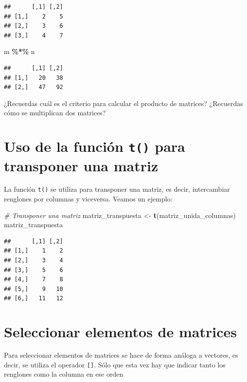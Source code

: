 \documentclass[
]{book}
\newenvironment{Shaded}{\begin{snugshade}}{\end{snugshade}}
\newcommand{\CommentTok}[1]{\textcolor[rgb]{0.56,0.35,0.01}{\textit{#1}}}
\newcommand{\FunctionTok}[1]{\textcolor[rgb]{0.13,0.29,0.53}{\textbf{#1}}}
\newcommand{\NormalTok}[1]{#1}
\newcommand{\OtherTok}[1]{\textcolor[rgb]{0.56,0.35,0.01}{#1}}
\newcommand{\SpecialCharTok}[1]{\textcolor[rgb]{0.81,0.36,0.00}{\textbf{#1}}}
\begin{document}
\begin{verbatim}
##      [,1] [,2]
## [1,]    2    5
## [2,]    3    6
## [3,]    4    7
\end{verbatim}

\begin{Shaded}
\begin{Highlighting}[]
\NormalTok{m }\SpecialCharTok{\%*\%}\NormalTok{ n }
\end{Highlighting}
\end{Shaded}

\begin{verbatim}
##      [,1] [,2]
## [1,]   20   38
## [2,]   47   92
\end{verbatim}

¿Recuerdas cuál es el criterio para calcular el producto de matrices?
¿Recuerdas cómo se multiplican dos matrices?

\section{\texorpdfstring{Uso de la función \texttt{t()} para transponer una matriz}{Uso de la función t() para transponer una matriz}}\label{uso-de-la-funciuxf3n-t-para-transponer-una-matriz}

La función \texttt{t()} se utiliza para transponer una matriz, es decir, intercambiar renglones por columnas y viceversa. Veamos un ejemplo:

\begin{Shaded}
\begin{Highlighting}[]
\CommentTok{\# Transponer una matriz}
\NormalTok{matriz\_transpuesta }\OtherTok{\textless{}{-}} \FunctionTok{t}\NormalTok{(matriz\_unida\_columnas)}
\NormalTok{matriz\_transpuesta}
\end{Highlighting}
\end{Shaded}

\begin{verbatim}
##      [,1] [,2]
## [1,]    1    2
## [2,]    3    4
## [3,]    5    6
## [4,]    7    8
## [5,]    9   10
## [6,]   11   12
\end{verbatim}

\section{Seleccionar elementos de matrices}\label{seleccionar-elementos-de-matrices}

Para seleccionar elementos de matrices se hace de forma análoga a vectores, es decir, se utiliza el operador \texttt{{[}{]}}. Sólo que esta vez hay que indicar tanto los renglones como la columna en ese orden
\end{document}
